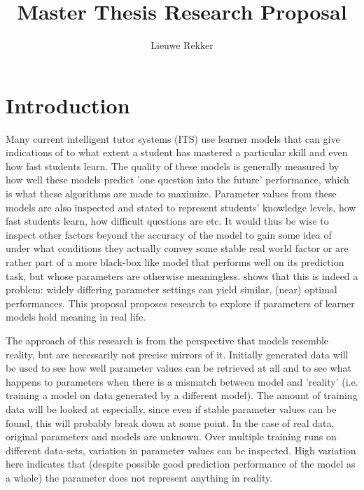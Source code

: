 \documentclass{article}
\begin{document}
\title{Master Thesis Research Proposal}
\author{Lieuwe Rekker}
\maketitle
\nocite{labelcombi}
\nocite{lftransfer}
\nocite{offtaskmodel}
\nocite{POKS1}
\nocite{matrixfact}
\nocite{importance}
\nocite{knowledgeproblem}
\nocite{modelreview}
\nocite{engagement}
\nocite{engageproficiency}
\nocite{eirt}
\nocite{pfa}
\nocite{ktpfa}
\nocite{skillcombi}
\nocite{lfa}

\section{Introduction}
Many current intelligent tutor systems (ITS) use learner models that can give indications of to what extent a student has mastered a particular skill and even how fast students learn. The quality of these models is generally measured by how well these models predict 'one question into the future' performance, which is what these algorithms are made to maximize. Parameter values from these models are also inspected and stated to represent students' knowledge levels, how fast students learn, how difficult questions are etc. It would thus be wise to inspect other factors beyond the accuracy of the model to gain some idea of under what conditions they actually convey some stable real world factor or are rather part of a more black-box like model that performs well on its prediction task, but whose parameters are otherwise meaningless. \cite{knowledgeproblem} shows that this is indeed a problem: widely differing parameter settings can yield similar, (near) optimal performances. This proposal proposes research to explore if parameters of learner models hold meaning in real life.

The approach of this research is from the perspective that models resemble reality, but are necessarily not precise mirrors of it. Initially generated data will be used to see how well parameter values can be retrieved at all and to see what happens to parameters when there is a mismatch between model and 'reality' (i.e. training a model on data generated by a different model). The amount of training data will be looked at especially, since even if stable parameter values can be found, this will probably break down at some point. In the case of real data, original parameters and models are unknown. Over multiple training runs on different data-sets, variation in parameter values can be inspected. High variation here indicates that (despite possible good prediction performance of the model as a whole) the parameter does not represent anything in reality.
\end{document}

